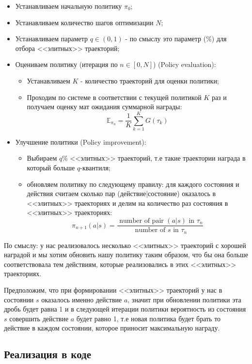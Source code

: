 \begin{itemize}
	\item Устанавливаем начальную политику $\pi_0$;
	\item Устанавливаем количество шагов оптимизации $N$;
	\item Устанавливаем параметр $q \in (0, 1)$ - по смыслу это параметр (\%) для отбора <<элитных>> траекторий; 
	\item Оцениваем политику (итерация по $n \in [0, N]$) (Policy evaluation):
	\begin{itemize}
		\item Устанавливаем $K$ - количество траекторий для оценки политики;
		\item Проходим по системе в соответствии с текущей политикой $K$ раз и получаем оценку мат ожидания суммарной награды: $$\mathbb{E}_{\pi_n} = \frac{1}{K}\sum_{k=1}^{K}G(\tau_k)$$
	\end{itemize}
	\item Улучшение политики (Policy improvement):
	\begin{itemize}
		\item Выбираем $q$\% <<элитных>> траекторий, т.е такие траектории награда в который больше $q$-квантиля;
		\item обновляем политику по следующему правилу: для каждого состояния и действия считаем сколько пар (действие|состояние) оказалось в <<элитных>> траекториях и делим на количество раз состояния в <<элитных>> траекториях: 
		$$\pi_{n+1}(a|s) = \frac{ \textrm{ number of pair } (a|s) \textrm{ in }\tau_n}{ \textrm{ number of } s \textrm{ in } \tau_n}$$ 
	\end{itemize}
\end{itemize}

По смыслу: у нас реализовалось несколько <<элитных>> траекторий с хорошей наградой и мы хотим обновить нашу политику таким образом, что бы она больше соответствовала тем действиям, которые реализовались в этих <<элитных>> траекториях.

Предположим, что при формировании <<элитных>> траекторий у нас в состоянии $s$ оказалось именно действие $a$, значит при обновлении политики эта дробь будет равна 1 и в следующей итерации политики вероятность из состояния $s$ совершить действие $a$ будет равно 1, т.е новая политика будет брать то действие в каждом состоянии, которое приносит максимальную награду.

\subsection{Реализация в коде}

